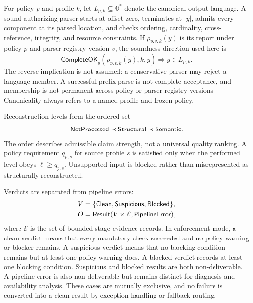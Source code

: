 For policy $p$ and profile $k$, let $L_{p,k}\subseteq\mathbb O^{*}$ denote the
canonical output language. A sound authorizing parser starts at offset zero,
terminates at $|y|$, admits every component at its parsed location, and checks
ordering, cardinality, cross-reference, integrity, and resource constraints.
If \(\rho_{p,v,k}(y)\) is its report under policy \(p\) and parser-registry
version \(v\), the soundness direction used here is
\begin{equation}
  \mathsf{CompleteOK}_{p}(\rho_{p,v,k}(y),k,y)
  \Longrightarrow y\in L_{p,k}.
  \label{eq:complete-profile}
\end{equation}
The reverse implication is not assumed: a conservative parser may reject a
language member. A successful prefix parse is not complete acceptance, and
membership is not permanent across policy or parser-registry versions.
Canonicality always refers to a named profile and frozen policy.

Reconstruction levels form the ordered set
\begin{equation}
  \mathsf{NotProcessed} \prec \mathsf{Structural} \prec \mathsf{Semantic}.
  \label{eq:reconstruction-order}
\end{equation}
The order describes admissible claim strength, not a universal quality ranking.
A policy requirement \(q_{p,s}\) for source profile \(s\) is satisfied only
when the performed level obeys \(\ell\geq q_{p,s}\). Unsupported input is blocked
rather than misrepresented as structurally reconstructed.

Verdicts are separated from pipeline errors:
\begin{equation}
\begin{aligned}
  V&=\{\mathsf{Clean},\mathsf{Suspicious},\mathsf{Blocked}\},\\
  O&=\mathsf{Result}(V\times \mathcal E,\mathsf{PipelineError}),
\end{aligned}
  \label{eq:verdict-space}
\end{equation}
where $\mathcal E$ is the set of bounded stage-evidence records. In enforcement mode, a clean verdict
means that every mandatory check succeeded and no policy warning or blocker
remains. A suspicious verdict means that no blocking condition remains but at
least one policy warning does. A blocked verdict records at least one blocking
condition. Suspicious and blocked results are both non-deliverable. A pipeline
error is also non-deliverable but remains distinct for diagnosis and
availability analysis. These cases are mutually exclusive, and no failure is
converted into a clean result by exception handling or fallback routing.

